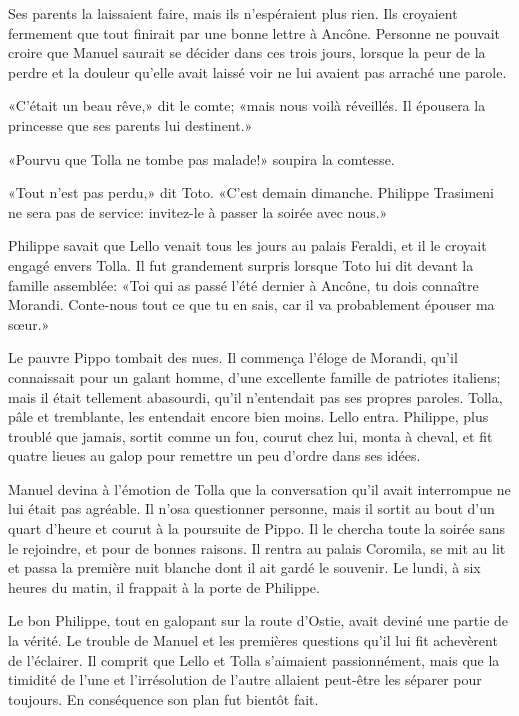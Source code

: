 Ses parents la laissaient faire, mais ils n'espéraient plus rien. Ils
croyaient fermement que tout finirait par une bonne lettre à Ancône.
Personne ne pouvait croire que Manuel saurait se décider dans ces trois
jours, lorsque la peur de la perdre et la douleur qu'elle avait laissé
voir ne lui avaient pas arraché une parole.

«C'était un beau rêve,» dit le comte; «mais nous voilà réveillés. Il
épousera la princesse que ses parents lui destinent.»

«Pourvu que Tolla ne tombe pas malade!» soupira la comtesse.

«Tout n'est pas perdu,» dit Toto. «C'est demain dimanche. Philippe
Trasimeni ne sera pas de service: invitez-le à passer la soirée avec
nous.»

Philippe savait que Lello venait tous les jours au palais Feraldi, et il
le croyait engagé envers Tolla. Il fut grandement surpris lorsque Toto
lui dit devant la famille assemblée: «Toi qui as passé l'été dernier à
Ancône, tu dois connaître Morandi. Conte-nous tout ce que tu en sais,
car il va probablement épouser ma sœur.»

Le pauvre Pippo tombait des nues. Il commença l'éloge de Morandi, qu'il
connaissait pour un galant homme, d'une excellente famille de patriotes
italiens; mais il était tellement abasourdi, qu'il n'entendait pas ses
propres paroles. Tolla, pâle et tremblante, les entendait encore bien
moins. Lello entra. Philippe, plus troublé que jamais, sortit comme un
fou, courut chez lui, monta à cheval, et fit quatre lieues au galop pour
remettre un peu d'ordre dans ses idées.

Manuel devina à l'émotion de Tolla que la conversation qu'il avait
interrompue ne lui était pas agréable. Il n'osa questionner personne,
mais il sortit au bout d'un quart d'heure et courut à la poursuite de
Pippo. Il le chercha toute la soirée sans le rejoindre, et pour de
bonnes raisons. Il rentra au palais Coromila, se mit au lit et passa la
première nuit blanche dont il ait gardé le souvenir. Le lundi, à six
heures du matin, il frappait à la porte de Philippe.

Le bon Philippe, tout en galopant sur la route d'Ostie, avait deviné une
partie de la vérité. Le trouble de Manuel et les premières questions
qu'il lui fit achevèrent de l'éclairer. Il comprit que Lello et Tolla
s'aimaient passionnément, mais que la timidité de l'une et
l'irrésolution de l'autre allaient peut-être les séparer pour toujours.
En conséquence son plan fut bientôt fait.

